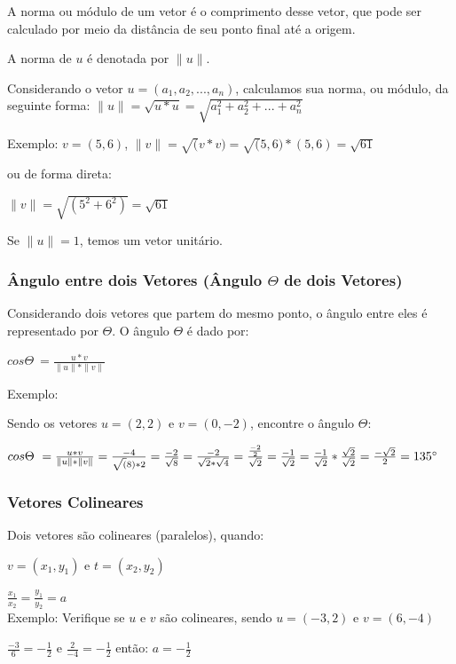 \documentclass[12pt]{article}
\begin{document}
A norma ou módulo de um vetor é o comprimento desse vetor, que pode ser calculado por meio da distância de seu ponto final até a origem.

A norma de \( u \) é denotada por \( \| u \| \).

Considerando o vetor \(u = (a_{1}, a_{2}, ..., a_{n})\), calculamos sua norma, ou módulo, da seguinte forma\cite{lipschutz-algebra, anton2012algebra}: \( \|u\| = \sqrt{u*u} = \sqrt{a_{1}^2 + a_{2}^2 + ... + a_{n}^2} \) 

Exemplo: \(v = (5, 6)\), \(\|v\| = \sqrt(v*v) = \sqrt(5,6)*(5,6) = \sqrt{61}\)

ou de forma direta:

\(\|v\| = \sqrt{(5^2+6^2)} = \sqrt{61}\)


Se \(\|u\| = 1\), temos um vetor unitário.

\subsubsection{Ângulo entre dois Vetores (Ângulo $\Theta$ de dois Vetores)}

Considerando dois vetores que partem do mesmo ponto, o ângulo entre eles é representado por $\Theta$. O ângulo $\Theta$ é dado por:

\(cos \Theta\ = \frac{u * v}{\|u\|*\|v\|}\)

Exemplo:

Sendo os vetores \(u = (2,2)\) e \(v=(0, -2)\), encontre o ângulo $\Theta$:

\(cos \Theta\ = \frac{u * v}{\|u\|*\|v\|} = \frac{-4}{\sqrt(8)*2} = \frac{-2}{\sqrt{8}}=\frac{-2}{\sqrt{2}*\sqrt{4}}=\frac{\frac{-2}{2}}{\sqrt{2}} = \frac{-1}{\sqrt{2}} = \frac{-1}{\sqrt{2}} * \frac{\sqrt{2}}{\sqrt{2}} = \frac{-\sqrt{2}}{2} = 135\degree\)

\subsubsection{Vetores Colineares}

Dois vetores são colineares (paralelos), quando:

\(v = (x_{1}, y_{1})\) e \(t = (x_{2}, y_{2})\)

\(\frac{x_{1}}{x_{2}} = \frac{y_{1}}{y_{2}} = a\)
\\

Exemplo: Verifique se \(u\) e \(v\) são colineares, sendo \(u = (-3, 2)\) e \(v=(6,-4)\)

\(\frac{-3}{6} = -\frac{1}{2}\) e \(\frac{2}{-4} = -\frac{1}{2}\) então: \(a = -\frac{1}{2}\)
\end{document}
